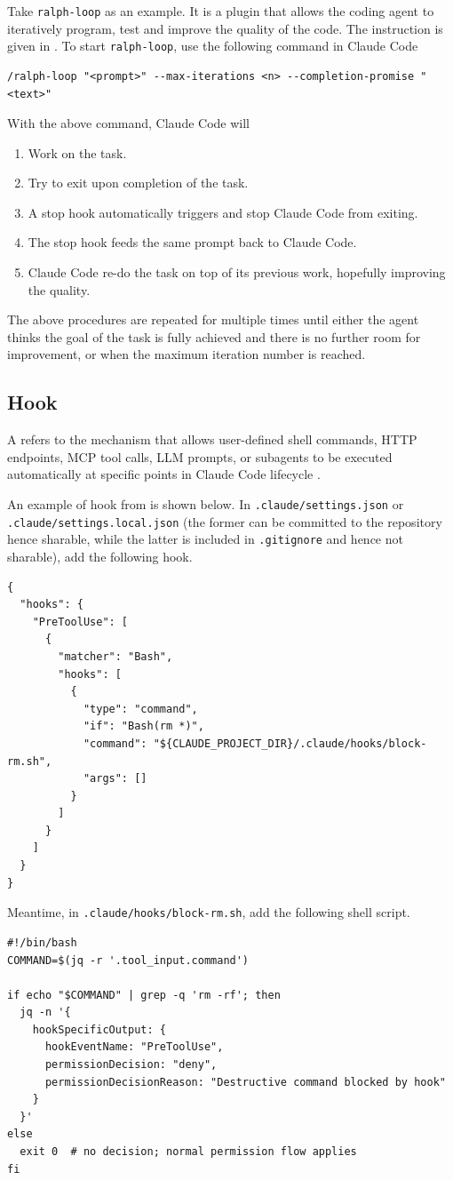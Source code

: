 Take \verb|ralph-loop| as an example. It is a plugin that allows the coding agent to iteratively program, test and improve the quality of the code. The instruction is given in \cite{claudeCode2026ralphWiggum}. To start \verb|ralph-loop|, use the following command in Claude Code
\begin{lstlisting}
/ralph-loop "<prompt>" --max-iterations <n> --completion-promise "<text>"
\end{lstlisting}
With the above command, Claude Code will
\begin{enumerate}
	\item Work on the task.
	\item Try to exit upon completion of the task.
	\item A stop hook automatically triggers and stop Claude Code from exiting.
	\item The stop hook feeds the same prompt back to Claude Code.
	\item Claude Code re-do the task on top of its previous work, hopefully improving the quality.
\end{enumerate}
The above procedures are repeated for multiple times until either the agent thinks the goal of the task is fully achieved and there is no further room for improvement, or when the maximum iteration number is reached.

\subsection{Hook}

A  refers to the mechanism that allows user-defined shell commands, HTTP endpoints, MCP tool calls, LLM prompts, or subagents to be executed automatically at specific points in Claude Code lifecycle \cite{claudeCode2026hooks}.

An example of hook from \cite{claudeCode2026hooks} is shown below. In \verb|.claude/settings.json| or \verb|.claude/settings.local.json| (the former can be committed to the repository hence sharable, while the latter is included in \verb|.gitignore| and hence not sharable), add the following hook.
\begin{lstlisting}
{
  "hooks": {
    "PreToolUse": [
      {
        "matcher": "Bash",
        "hooks": [
          {
            "type": "command",
            "if": "Bash(rm *)",
            "command": "${CLAUDE_PROJECT_DIR}/.claude/hooks/block-rm.sh",
            "args": []
          }
        ]
      }
    ]
  }
}
\end{lstlisting}
Meantime, in \verb|.claude/hooks/block-rm.sh|, add the following shell script.
\begin{lstlisting}
#!/bin/bash
COMMAND=$(jq -r '.tool_input.command')

if echo "$COMMAND" | grep -q 'rm -rf'; then
  jq -n '{
    hookSpecificOutput: {
      hookEventName: "PreToolUse",
      permissionDecision: "deny",
      permissionDecisionReason: "Destructive command blocked by hook"
    }
  }'
else
  exit 0  # no decision; normal permission flow applies
fi
\end{lstlisting}

